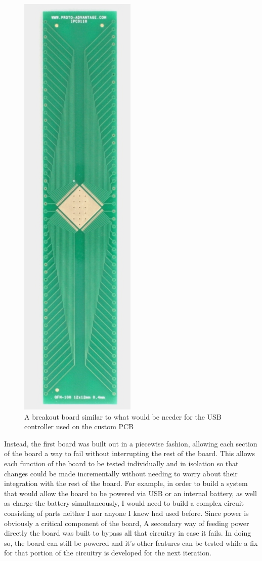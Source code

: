 \begin{figure}[h]
  \centering
  \includegraphics[height=0.9\textwidth,angle=90]{Figures/smt_breakout}
  \captionsetup{width=.8\linewidth}
  \caption[SMD Breakout Board]{A breakout board similar to what would be needer for the USB controller used on the custom PCB}
  \label{fig:smt_breakout}
\end{figure}

Instead, the first board was built out in a piecewise fashion, allowing each section of the board a way to fail without interrupting the rest of the board.
This allows each function of the board to be tested individually and in isolation so that changes could be made incrementally without needing to worry about their integration with the rest of the board.
For example, in order to build a system that would allow the board to be powered via USB or an internal battery, as well as charge the battery simultaneously, I would need to build a complex circuit consisting of parts neither I nor anyone I knew had used before.
Since power is obviously a critical component of the board, A secondary way of feeding power directly the board was built to bypass all that circuitry in case it fails.
In doing so, the board can still be powered and it's other features can be tested while a fix for that portion of the circuitry is developed for the next iteration.


